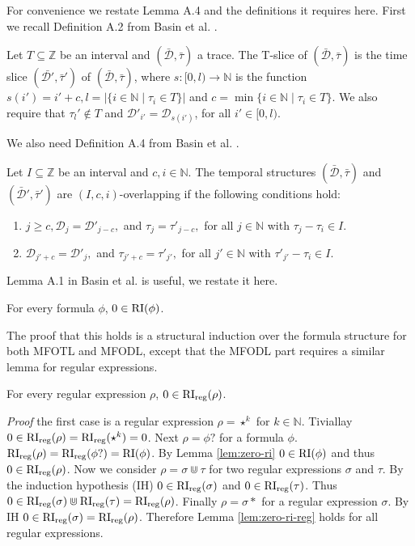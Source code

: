 For convenience we restate Lemma A.4 and the definitions it requires here.
First we recall Definition A.2 from Basin et al. \cite{Basin2016}.
\begin{definition}
    \label{def:t-slice}
    Let $T \subseteq \mathbb{Z}$ be an interval and $(\bar{\mathcal{D}}, \bar{\tau})$ a trace.
    The T-slice of $(\bar{\mathcal{D}}, \bar{\tau})$ is the time slice $(\bar{\mathcal{D}'}, \bar{\tau}')$ of $(\bar{\mathcal{D}}, \bar{\tau})$, 
        where $s: [0,l) \to \mathbb{N}$ is the function $s(i') = i' + c, l = |\{i \in \mathbb{N} \mid \tau_i \in T \}|$ and $c = \min\{i \in \mathbb{N} \mid \tau_i \in T \}$.
    We also require that $\tau_l' \not\in T$ and $\mathcal{D}'_{i'} = \mathcal{D}_{s(i')}$, for all $i' \in [0,l)$.
\end{definition}
We also need Definition A.4 from Basin et al. \cite{Basin2016}.
\begin{definition}
    \label{def:overlapping}
    Let $I \subseteq \mathbb{Z}$ be an interval and $c,i \in \mathbb{N}$.
    The temporal structures $(\bar{\mathcal{D}}, \bar{\tau})$ and $(\bar{\mathcal{D}}', \bar{\tau}')$ are $(I,c,i)$-overlapping if the following conditions hold:
    \renewcommand{\labelenumi}{\arabic{enumi}.}
    \begin{enumerate}
        \item $j \geq c, \mathcal{D}_j = \mathcal{D}'_{j-c},$ and $\tau_j = \tau'_{j-c},$ for all $j \in \mathbb{N}$ with $\tau_j - \tau_i \in I$.
        \item $\mathcal{D}_{j'+c} = \mathcal{D}'_j,$ and $\tau_{j'+c} = \tau'_{j'},$ for all $j' \in \mathbb{N}$ with $\tau'_{j'}-\tau_i \in I$.
    \end{enumerate}
\end{definition}

Lemma A.1 in Basin et al. \cite{Basin2016} is useful, we restate it here.
\begin{lemma}
    \label{lem:zero-ri}
    For every formula $\phi$, $0 \in \operatorname{RI}(\phi)$.
\end{lemma}
The proof that this holds is a structural induction over the formula structure for both MFOTL and MFODL, except that the MFODL part requires a similar lemma for regular expressions.

\begin{lemma}
    \label{lem:zero-ri-reg}
    For every regular expression $\rho$, $0 \in \operatorname{RI}_{\text{reg}}(\rho)$.
\end{lemma}
\textit{Proof} the first case is a regular expression $\rho = \star^k$ for $k \in \mathbb{N}$.
Tiviallay $0 \in \operatorname{RI}_{\text{reg}}(\rho) = \operatorname{RI}_{\text{reg}}(\star^k) = {0}$.
Next $\rho = \phi?$ for a formula $\phi$.
$\operatorname{RI}_{\text{reg}}(\rho) = \operatorname{RI}_{\text{reg}}(\phi?) = \operatorname{RI}(\phi)$.
By Lemma \ref{lem:zero-ri} $0 \in \operatorname{RI}(\phi)$ and thus $0 \in \operatorname{RI}_{\text{reg}}(\rho)$.
Now we consider $\rho = \sigma \Cup \tau$ for two regular expressions $\sigma$ and $\tau$.
By the induction hypothesis (IH) $0 \in \operatorname{RI}_{\text{reg}}(\sigma)$ and $0 \in \operatorname{RI}_{\text{reg}}(\tau)$.
Thus $0 \in \operatorname{RI}_{\text{reg}}(\sigma) \Cup \operatorname{RI}_{\text{reg}}(\tau) = \operatorname{RI}_{\text{reg}}(\rho)$.
Finally $\rho = \sigma *$ for a regular expression $\sigma$.
By IH $0 \in \operatorname{RI}_{\text{reg}}(\sigma) = \operatorname{RI}_{\text{reg}}(\rho)$.
Therefore Lemma \ref{lem:zero-ri-reg} holds for all regular expressions.

